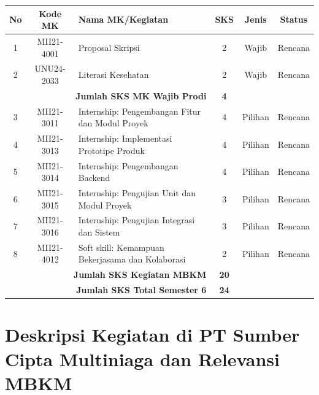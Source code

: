 \documentclass[a4paper,12pt]{article}
\begin{document}
\begin{table}[H] %
    \centering
    \begin{tabular}{|c|c|p{7cm}|c|c|c|}
        \hline
        \textbf{No} & \textbf{Kode MK} & \textbf{Nama MK/Kegiatan} & \textbf{SKS} & \textbf{Jenis} & \textbf{Status} \\
        \hline
        1 & MII21-4001 & Proposal Skripsi & 2 & Wajib & Rencana \\
        2 & UNU24-2033 & Literasi Kesehatan & 2 & Wajib & Rencana \\
        \hline
        \multicolumn{3}{|r|}{\textbf{Jumlah SKS MK Wajib Prodi}} & \textbf{4} & & \\
        \hline
        3 & MII21-3011 & Internship: Pengembangan Fitur dan Modul Proyek & 4 & Pilihan & Rencana \\
        4 & MII21-3013 & Internship: Implementasi Prototipe Produk & 4 & Pilihan & Rencana \\
        5 & MII21-3014 & Internship: Pengembangan Backend & 4 & Pilihan & Rencana \\
        6 & MII21-3015 & Internship: Pengujian Unit dan Modul Proyek & 3 & Pilihan & Rencana \\
        7 & MII21-3016 & Internship: Pengujian Integrasi dan Sistem & 3 & Pilihan & Rencana \\
        8 & MII21-4012 & Soft skill: Kemampuan Bekerjasama dan Kolaborasi & 2 & Pilihan & Rencana \\
        \hline
        \multicolumn{3}{|r|}{\textbf{Jumlah SKS Kegiatan MBKM}} & \textbf{20} & & \\
        \hline
        \multicolumn{3}{|r|}{\textbf{Jumlah SKS Total Semester 6}} & \textbf{24} & & \\
        \hline
    \end{tabular}
\end{table}

\clearpage

\section{Deskripsi Kegiatan di PT Sumber Cipta Multiniaga dan Relevansi MBKM}
\end{document}
